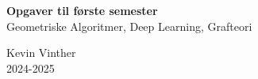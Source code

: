 

\begin{center}
	\noindent
	{\huge \bfseries \sffamily \color{DeepSeaBlue} Opgaver til første semester}\\
	\vspace{0.2cm}
	{\large \sffamily Geometriske Algoritmer, Deep Learning, Grafteori}\\
	\vspace{1.0cm}

	\begin{center}

	\end{center}
	\vspace{3.8cm}
	{\large \sffamily \color{gray} Kevin Vinther}\\
	{\large \sffamily \color{gray} 2024-2025}
\end{center}

\thispagestyle{empty}


\newpage
\tableofcontents
\newpage







\newpage


